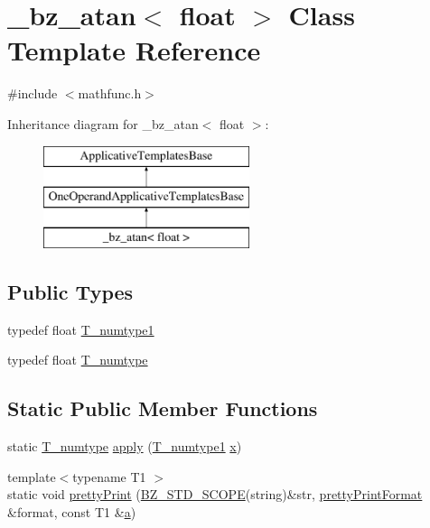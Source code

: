 \hypertarget{class__bz__atan_3_01float_01_4}{}\section{\+\_\+bz\+\_\+atan$<$ float $>$ Class Template Reference}
\label{class__bz__atan_3_01float_01_4}


{\ttfamily \#include $<$mathfunc.\+h$>$}

Inheritance diagram for \+\_\+bz\+\_\+atan$<$ float $>$\+:\begin{figure}[H]
\begin{center}
\leavevmode
\includegraphics[height=3.000000cm]{class__bz__atan_3_01float_01_4}
\end{center}
\end{figure}
\subsection*{Public Types}
\begin{DoxyCompactItemize}
\item 
typedef float \hyperlink{class__bz__atan_3_01float_01_4_a7e96526f8601a8c2ed26fd9eb6d8e9b8}{T\+\_\+numtype1}
\item 
typedef float \hyperlink{class__bz__atan_3_01float_01_4_a0aa949f106998b11eeb92c15c92bb82f}{T\+\_\+numtype}
\end{DoxyCompactItemize}
\subsection*{Static Public Member Functions}
\begin{DoxyCompactItemize}
\item 
static \hyperlink{class__bz__atan_3_01float_01_4_a0aa949f106998b11eeb92c15c92bb82f}{T\+\_\+numtype} \hyperlink{class__bz__atan_3_01float_01_4_ae1a3bb1d5d1f4c859592c44441ed6283}{apply} (\hyperlink{class__bz__atan_3_01float_01_4_a7e96526f8601a8c2ed26fd9eb6d8e9b8}{T\+\_\+numtype1} \hyperlink{vecnorm1_8cc_ac73eed9e41ec09d58f112f06c2d6cb63}{x})
\item 
{\footnotesize template$<$typename T1 $>$ }\\static void \hyperlink{class__bz__atan_3_01float_01_4_a824c9fdddfc256afc86a36c7f78b6abb}{pretty\+Print} (\hyperlink{numinquire_8h_a2b24ffc3b4ef9803956bc7715c6c7b83}{B\+Z\+\_\+\+S\+T\+D\+\_\+\+S\+C\+O\+P\+E}(string)\&str, \hyperlink{classprettyPrintFormat}{pretty\+Print\+Format} \&format, const T1 \&\hyperlink{gen__mat5files_8m_aae328bf20413f220e38aec4d95bfd6da}{a})
\end{DoxyCompactItemize}


